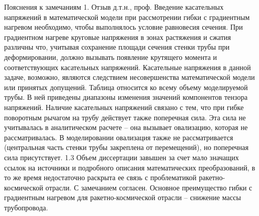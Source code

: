 Пояснения к замечаниям
1. Отзыв д.т.н., проф. \opponentOneWhomFioShort
Введение касательных напряжений в математической модели при рассмотрении гибки с градиентным нагревом необходимо, чтобы выполнялось условие равновесия сечения. При градиентном нагреве круговые напряжения в зонах растяжения и сжатия различны что, учитывая сохранение площади сечения стенки трубы при деформировании, должно вызывать появление крутящего момента и соответствующих касательных напряжений. Касательные напряжения в данной задаче, возможно, являются следствием несовершенства математической модели или принятых допущений.
Таблица относится ко всему объему моделируемой трубы. В ней приведены диапазоны изменения значений компонентов тензора напряжений. Наличие касательных напряжений связано с тем, что при гибке поворотным рычагом на трубу действует также поперечная сила. Эта сила не учитывалась в аналитическом расчете – она вызывает овализацию, которая не рассматривалась. В моделировании овализация также не рассматривается (центральная часть стенки трубы закреплена от перемещений), но поперечная сила присутствует.
1.3 Объем диссертации завышен за счет мало значащих ссылок на источники и подробного описания математических преобразований, в то же время недостаточно раскрыта ее связь с проблематикой ракетно-космической отрасли.
С замечанием согласен. Основное преимущество гибки с градиентным нагревом для ракетно-космической отрасли – снижение массы трубопровода.

